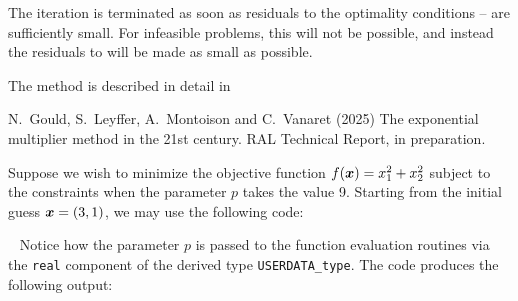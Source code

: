 \documentclass{galahad}
\newcommand{\package}{expo}
\begin{document}
The iteration is terminated as soon as residuals to the
optimality conditions -- are sufficiently small. For 
infeasible problems, this will not be possible, and instead the
residuals to   will be made as small as possible.

\galreferences
\vspace*{1mm}

\noindent
The method is described in detail in
\vspace*{1mm}

\noindent
N.\ Gould, S.\ Leyffer, A.\ Montoison and C.\ Vanaret (2025)
The exponential multiplier method in the 21st century.
RAL Technical Report, in preparation.


\galexamples
Suppose we wish to minimize the objective function
$f({\bm{x}}) = x_1^2 + x_2^2$ subject to the constraints
when the parameter $p$ takes the value 9.
Starting from the initial guess ${\bm{x}} = (3,1)$, we may use the following code:

\renewcommand{\packagedir}{\galahaddir/src/forthcoming/\package}
{\tt \small
\VerbatimInput{\packageexample}
}
\noindent
Notice how the parameter $p$ is passed to the function evaluation
routines via the {\tt real} component of the derived type {\tt USERDATA\_type}.
The code produces the following output:
{\tt \small
\VerbatimInput{\packageresults}
}
\noindent
\end{document}
